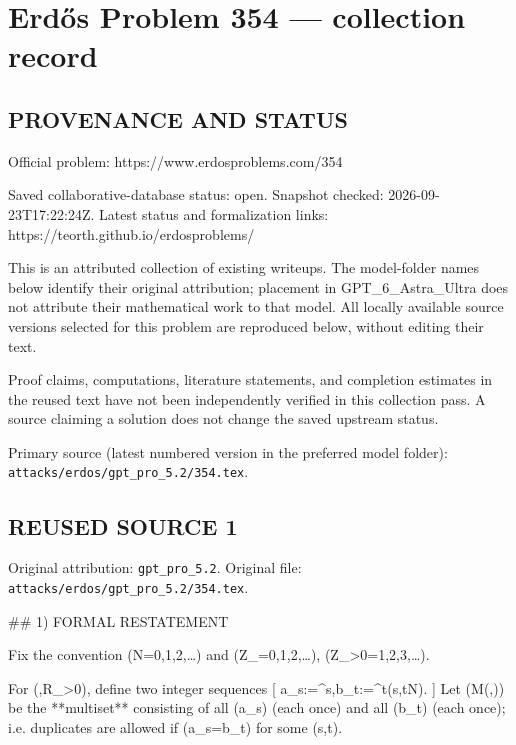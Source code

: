 \section*{Erd\H{o}s Problem 354 --- collection record}

\subsection*{PROVENANCE AND STATUS}
Official problem: https://www.erdosproblems.com/354

Saved collaborative-database status: open.
Snapshot checked: 2026-09-23T17:22:24Z.
Latest status and formalization links: https://teorth.github.io/erdosproblems/

This is an attributed collection of existing writeups. The model-folder names below identify their original attribution; placement in GPT\_6\_Astra\_Ultra does not attribute their mathematical work to that model. All locally available source versions selected for this problem are reproduced below, without editing their text.

Proof claims, computations, literature statements, and completion estimates in the reused text have not been independently verified in this collection pass. A source claiming a solution does not change the saved upstream status.

Primary source (latest numbered version in the preferred model folder): \texttt{attacks/erdos/gpt\_pro\_5.2/354.tex}.

\subsection*{REUSED SOURCE 1}
Original attribution: \texttt{gpt\_pro\_5.2}.
Original file: \texttt{attacks/erdos/gpt\_pro\_5.2/354.tex}.

## 1) FORMAL RESTATEMENT

Fix the convention (\mathbb N={0,1,2,\dots}) and (\mathbb Z_{}={0,1,2,\dots}), (\mathbb Z_{>0}={1,2,3,\dots}).

For (\alpha,\beta\in\mathbb R_{>0}), define two integer sequences
[
a_s:=\big{}^s\alpha\big\rfloor,\qquad b_t:=\big{}^t\beta\big\rfloor\qquad (s,t\in\mathbb N).
]
Let (M(\alpha,\beta)) be the **multiset** consisting of all (a_s) (each once) and all (b_t) (each once); i.e. duplicates are allowed if (a_s=b_t) for some (s,t).

